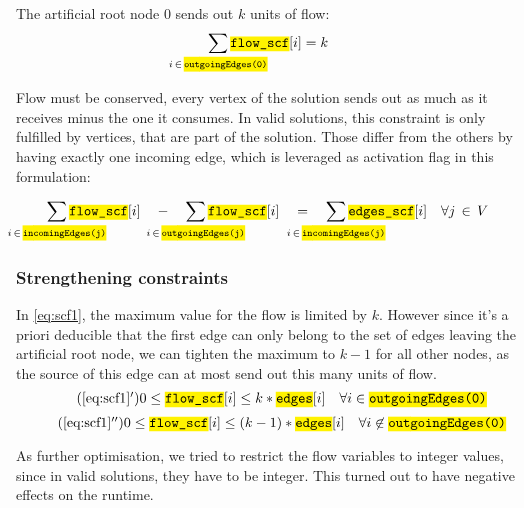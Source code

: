 \documentclass[,%
			paper=a4,%
			DIV12,
			liststotoc,
			bibtotoc,
			draft=false,%
			numbers=noendperiod
			]{scrartcl}
\newcommand{\ilc}[1]{\hl{\texttt{#1}}} %
\begin{document}
The artificial root node $0$ sends out $k$ units of flow:\nolinebreak
\begin{equation}
	\sum_{\mathclap{i\,\in\,\ilc{outgoingEdges(0)}}} \ilc{flow\_scf}[i] = k
\end{equation}

Flow must be conserved, every vertex of the solution sends out as much as it receives minus the one it consumes. In valid solutions, this constraint is only fulfilled by vertices, that are part of the solution. Those differ from the others by having exactly one incoming edge, which is leveraged as activation flag in this formulation:

\begin{equation}
	\sum_{\mathclap{i\,\in\,\ilc{incomingEdges(j)}}} \ilc{flow\_scf}[i] \quad - \quad
	\sum_{\mathclap{i\,\in\,\ilc{outgoingEdges(j)}}} \ilc{flow\_scf}[i] \quad = \quad 
	\sum_{\mathclap{i\,\in\,\ilc{incomingEdges(j)}}} \ilc{edges\_scf}[i] 
	\quad \forall j\,\in\,V
\end{equation}


\subsubsection{Strengthening constraints}

In \eqref{eq:scf1}, the maximum value for the flow is limited by $k$. However since it's a priori deducible that the first edge can only belong to the set of edges leaving the artificial root node, we can tighten the maximum to $k-1$ for all other nodes, as the source of this edge can at most send out this many units of flow.
\begin{equation}\tag{\ref{eq:scf1}$^\prime$}
	0 \leq \ilc{flow\_scf}[i] \leq k * \ilc{edges}[i] \quad \forall i \in \ilc{outgoingEdges(0)} 
\end{equation}
\begin{equation}\tag{\ref{eq:scf1}$^{\prime\prime}$}
	0 \leq \ilc{flow\_scf}[i] \leq (k-1) * \ilc{edges}[i] \quad \forall i \not\in \ilc{outgoingEdges(0)}
\end{equation}

As further optimisation, we tried to restrict the flow variables to integer values, since in valid solutions, they have to be integer. This turned out to have negative effects on the runtime.


\begin{comment}
	- flow on each edge
	- 0 <= flow\_i <= k/k-1 * edge
	- root note emits
	- every node eats/flow conservation
\end{comment}
\end{document}
